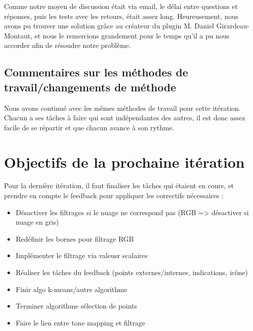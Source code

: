 \documentclass[12pt,titlepage,french]{article}
\begin{document}
Comme notre moyen de discussion était via email, le délai entre questions et réponses, puis les tests avec les retours, était assez long. Heureusement, nous avons pu trouver une solution grâce au créateur du plugin M. Daniel Girardeau-Montaut, et nous le remercions grandement pour le temps qu'il a pu nous accorder afin de résoudre notre problème.

\subsection{Commentaires sur les méthodes de travail/changements de méthode}

Nous avons continué avec les mêmes méthodes de travail pour cette itération. Chacun a ses tâches à faire qui sont indépendantes des autres, il est donc assez facile de se répartir et que chacun avance à son rythme.

\section{Objectifs de la prochaine itération}

Pour la dernière itération, il faut finaliser les tâches qui étaient en cours, et prendre en compte le feedback pour appliquer les correctifs nécessaires :

\begin{itemize}
    \item Désactiver les filtrages si le nuage ne correspond pas (RGB => désactiver si nuage en gris)
    \item Redéfinir les bornes pour filtrage RGB
    \item Implémenter le filtrage via valeusr scalaires
    \item Réaliser les tâches du feedback (points externes/internes, indications, icône)
    \item Finir algo k-means/autre algorithme
    \item Terminer algorithme sélection de points
    \item Faire le lien entre tone mapping et filtrage
\end{itemize}
\end{document}
